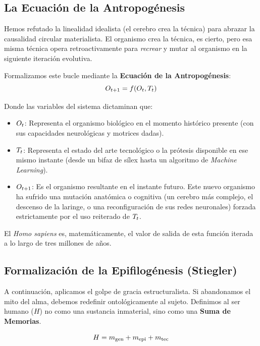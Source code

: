 \subsection{La Ecuación de la Antropogénesis}

Hemos refutado la linealidad idealista (el cerebro crea la técnica) para abrazar la causalidad circular materialista. El organismo crea la técnica, es cierto, pero esa misma técnica opera retroactivamente para \textit{recrear} y mutar al organismo en la siguiente iteración evolutiva.

Formalizamos este bucle mediante la \textbf{Ecuación de la Antropogénesis}:
\begin{equation}
    O_{t+1} = f(O_{t}, T_{t})
\end{equation}

Donde las variables del sistema dictaminan que:
\begin{itemize}
    \item $O_{t}$: Representa el organismo biológico en el momento histórico presente (con sus capacidades neurológicas y motrices dadas).
    \item $T_{t}$: Representa el estado del arte tecnológico o la prótesis disponible en ese mismo instante (desde un bifaz de sílex hasta un algoritmo de \textit{Machine Learning}).
    \item $O_{t+1}$: Es el organismo resultante en el instante futuro. Este nuevo organismo ha sufrido una mutación anatómica o cognitiva (un cerebro más complejo, el descenso de la laringe, o una reconfiguración de sus redes neuronales) forzada estrictamente por el uso reiterado de $T_{t}$.
\end{itemize}

El \textit{Homo sapiens} es, matemáticamente, el valor de salida de esta función iterada a lo largo de tres millones de años.

\subsection{Formalización de la Epifilogénesis (Stiegler)}

A continuación, aplicamos el golpe de gracia estructuralista. Si abandonamos el mito del alma, debemos redefinir ontológicamente al sujeto. Definimos al ser humano ($H$) no como una sustancia inmaterial, sino como una \textbf{Suma de Memorias}.

\begin{equation}
    H = m_{\text{gen}} + m_{\text{epi}} + m_{\text{tec}}
\end{equation}

